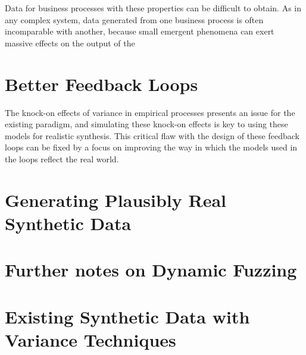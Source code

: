 \documentclass[draft,12pt]{article}
\begin{document}
Data for business processes with these properties can be difficult to obtain.
As in any complex system, data generated from one business process is often
incomparable with another, because small emergent phenomena can exert massive
effects on the output of the 
\par


\section{Better Feedback Loops}
The knock-on effects of variance in empirical processes presents an issue for
the existing paradigm, and simulating these knock-on effects is key to using
these models for realistic synthesis. This critical flaw with the design of
these feedback loops can be fixed by a focus on improving the way in which the
models used in the loops reflect the real world.
\par



\section{Generating Plausibly Real Synthetic Data}



\section{Further notes on Dynamic Fuzzing}




\section{Existing Synthetic Data with Variance Techniques}

\end{document}
